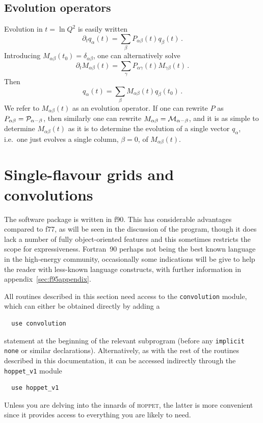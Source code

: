 \documentclass[12pt]{article}
\newcommand{\hoppet}{\textsc{hoppet}\xspace}
\newcommand{\ttt}[1]{\texttt{#1}}
\begin{document}
\subsection{Evolution operators}
\label{sec:evop}
Evolution in $t = \ln Q^2$ is easily written
\begin{equation}
  \partial_t q_{\alpha}(t)  = \sum_{\beta} P_{\alpha\beta}(t) q_\beta(t)\,.
\end{equation}
Introducing $M_{\alpha\beta}(t_0) = \delta_{\alpha\beta}$, one can
alternatively solve
\begin{equation}
  \partial_t M_{\alpha\beta}(t)  = \sum_{\gamma} P_{\alpha\gamma}(t)
  M_{\gamma\beta}(t)\,.
\end{equation}
Then 
\begin{equation}
  q_{\alpha}(t)  = \sum_{\beta} M_{\alpha\beta}(t) q_\beta(t_0)\,.
\end{equation}
We refer to $M_{\alpha\beta}(t)$ as an evolution operator.
%
If one can rewrite $P$ as $P_{\alpha\beta} = \cal P_{\alpha-\beta}$,
then similarly one can rewrite $M_{\alpha\beta} = \cal
M_{\alpha-\beta}$, and it is as simple to determine
$M_{\alpha\beta}(t)$ as it is to determine the evolution of a single
vector $q_\alpha$, i.e.\ one just evolves a single column, $\beta =
0$, of $M_{\alpha\beta}(t)$.


\section{Single-flavour grids and convolutions}

The software package is written in f90. This has considerable
advantages compared to f77, as will be seen in the discussion of the
program, though it does lack a number of fully object-oriented
features and this sometimes restricts the scope for expressiveness.
Fortran~90 perhaps not being the best known language in the
high-energy community, occasionally some indications will be give to
help the reader with less-known language constructs, with further
information in appendix~\ref{sec:f95appendix}.

All routines described in this section need access to the
\texttt{convolution} module, which can either be obtained directly by
adding a 
\begin{verbatim}
  use convolution
\end{verbatim}
statement at the beginning of the relevant subprogram (before
any \ttt{implicit none} or similar declarations). Alternatively, as
with the rest of the routines described in this documentation, it can
be accessed indirectly through the \ttt{hoppet\_v1} module
\begin{verbatim}
  use hoppet_v1
\end{verbatim}
Unless you are delving into the innards of  \hoppet, the latter is
more convenient since it provides access to everything you are likely
to need.
\end{document}
